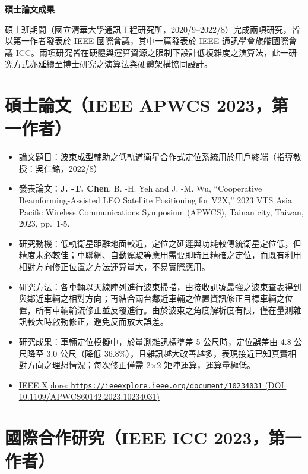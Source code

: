 \documentclass[11pt,fontset=none]{ctexart}
\newcommand{\paperlink}[2]{\href{#1}{\footnotesize IEEE Xplore: \texttt{#1} (DOI: #2)}}
\begin{document}
\begin{center}
  {\Large\bfseries 碩士論文成果\par}
\end{center}

碩士班期間（國立清華大學通訊工程研究所，2020/9--2022/8）完成兩項研究，皆以第一作者發表於 IEEE 國際會議，其中一篇發表於 IEEE 通訊學會旗艦國際會議 ICC。兩項研究皆在硬體與運算資源之限制下設計低複雜度之演算法，此一研究方式亦延續至博士研究之演算法與硬體架構協同設計。

\section{碩士論文（IEEE APWCS 2023，第一作者）}

\begin{itemize}
  \item 論文題目：波束成型輔助之低軌道衛星合作式定位系統用於用戶終端（指導教授：吳仁銘，2022/8）
  \item 發表論文：\textbf{J. -T. Chen}, B. -H. Yeh and J. -M. Wu, ``Cooperative Beamforming-Assisted LEO Satellite Positioning for V2X,'' 2023 VTS Asia Pacific Wireless Communications Symposium (APWCS), Tainan city, Taiwan, 2023, pp.~1-5.
  \item 研究動機：低軌衛星距離地面較近，定位之延遲與功耗較傳統衛星定位低，但精度未必較佳；車聯網、自動駕駛等應用需要即時且精確之定位，而既有利用相對方向修正位置之方法運算量大，不易實際應用。
  \item 研究方法：各車輛以天線陣列進行波束掃描，由接收訊號最強之波束查表得到與鄰近車輛之相對方向；再結合兩台鄰近車輛之位置資訊修正目標車輛之位置，所有車輛輪流修正並反覆進行。由於波束之角度解析度有限，僅在量測雜訊較大時啟動修正，避免反而放大誤差。
  \item 研究成果：車輛定位模擬中，於量測雜訊標準差 5 公尺時，定位誤差由 4.8 公尺降至 3.0 公尺（降低 36.8\%），且雜訊越大改善越多，表現接近已知真實相對方向之理想情況；每次修正僅需 2×2 矩陣運算，運算量極低。
  \item \paperlink{https://ieeexplore.ieee.org/document/10234031}{10.1109/APWCS60142.2023.10234031}
\end{itemize}

\section{國際合作研究（IEEE ICC 2023，第一作者）}
\end{document}
